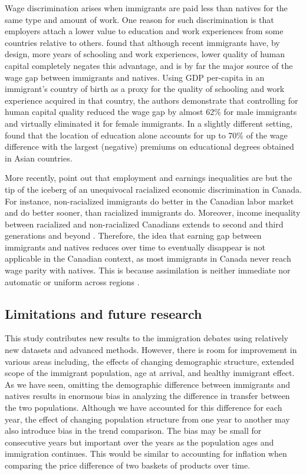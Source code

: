 \vspace{0.7em}\par
Wage discrimination arises when immigrants are paid less than natives for the same type and amount of work.
One reason for such discrimination is that employers attach a lower value to education and work experiences from some countries relative to others.
\citet{Coulombe:2014ir} found that although recent immigrants have, by design, more years of schooling and work experiences, lower quality of human capital completely negates this advantage, and is by far the major source of the wage gap between immigrants and natives.
Using GDP per-capita in an immigrant's country of birth as a proxy for the quality of schooling and work experience acquired in that country, the authors demonstrate that controlling for human capital quality reduced the wage gap by almost 62\% for male immigrants and virtually eliminated it for female immigrants.
In a slightly different setting, \citet{Fortin:2016hl} found that the location of education alone accounts for up to 70\% of the wage difference with the largest (negative) premiums on educational degrees obtained in Asian countries.

\vspace{0.7em}\par
More recently,  \citet{Block:2019va} point out that employment and earnings inequalities are but the tip of the iceberg of an unequivocal racialized economic discrimination in Canada.
For instance, non-racialized immigrants do better in the Canadian labor market and do better sooner, than racialized immigrants do.
Moreover, income inequality between racialized and non-racialized Canadians extends to second and third generations and beyond \citep{Block:2019va}.
Therefore, the idea that earning gap between immigrants and natives reduces over time to eventually disappear is not applicable in the Canadian context, as most immigrants in Canada never reach wage parity with natives.
This is because assimilation is neither immediate nor automatic \citep{Hum:2000gz} or uniform across regions \citep{Nadeau:2010jd}.


\subsection{Limitations and future research}

This study contributes new results to the immigration debates using relatively new datasets and advanced methods.
However, there is room for improvement in various areas including, the effects of changing demographic structure, extended scope of the immigrant population, age at arrival, and healthy immigrant effect.
As we have seen, omitting the demographic difference between immigrants and natives results in enormous bias in analyzing the difference in transfer between the two populations.
Although we have accounted for this difference for each year, the effect of changing population structure from one year to another may also introduce bias in the trend comparison.
The bias may be small for consecutive years but important over the years as the population ages and immigration continues.
This would be similar to accounting for inflation when comparing the price difference of two baskets of products over time.

